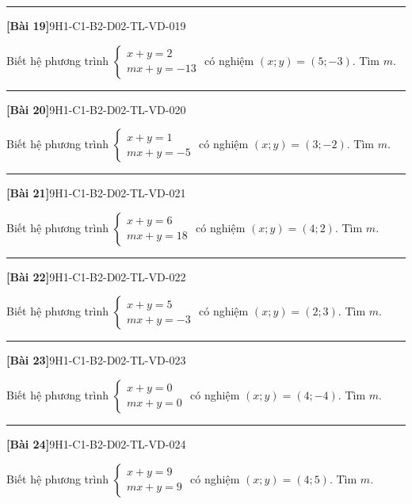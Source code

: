 \documentclass[12pt,a4paper]{article}
\newif\ifloigiai
\newenvironment{cauhoi}[2]{%
  \par\medskip\noindent\rule{\textwidth}{0.4pt}\par\nopagebreak
  \noindent\textbf{[#1]}\hfill{\scriptsize\ttfamily #2}\par\nopagebreak\smallskip}{\par}
\newcommand{\loigiai}[1]{\ifloigiai\par\smallskip\noindent\textit{Lời giải.} #1\par\fi}
\begin{document}
\begin{cauhoi}{Bài 19}{9H1-C1-B2-D02-TL-VD-019}
Biết hệ phương trình $\begin{cases}x+y=2\\ mx+y=-13\end{cases}$ có nghiệm $(x;y)=(5;-3)$. Tìm $m$.
\loigiai{Thay $x=5$, $y=-3$ vào phương trình thứ hai: $5 m-3=-13$ nên $m=\dfrac{-13+3}{5}=-2$.}
\end{cauhoi}
\begin{cauhoi}{Bài 20}{9H1-C1-B2-D02-TL-VD-020}
Biết hệ phương trình $\begin{cases}x+y=1\\ mx+y=-5\end{cases}$ có nghiệm $(x;y)=(3;-2)$. Tìm $m$.
\loigiai{Thay $x=3$, $y=-2$ vào phương trình thứ hai: $3 m-2=-5$ nên $m=\dfrac{-5+2}{3}=-1$.}
\end{cauhoi}
\begin{cauhoi}{Bài 21}{9H1-C1-B2-D02-TL-VD-021}
Biết hệ phương trình $\begin{cases}x+y=6\\ mx+y=18\end{cases}$ có nghiệm $(x;y)=(4;2)$. Tìm $m$.
\loigiai{Thay $x=4$, $y=2$ vào phương trình thứ hai: $4 m+2=18$ nên $m=\dfrac{18-2}{4}=4$.}
\end{cauhoi}
\begin{cauhoi}{Bài 22}{9H1-C1-B2-D02-TL-VD-022}
Biết hệ phương trình $\begin{cases}x+y=5\\ mx+y=-3\end{cases}$ có nghiệm $(x;y)=(2;3)$. Tìm $m$.
\loigiai{Thay $x=2$, $y=3$ vào phương trình thứ hai: $2 m+3=-3$ nên $m=\dfrac{-3-3}{2}=-3$.}
\end{cauhoi}
\begin{cauhoi}{Bài 23}{9H1-C1-B2-D02-TL-VD-023}
Biết hệ phương trình $\begin{cases}x+y=0\\ mx+y=0\end{cases}$ có nghiệm $(x;y)=(4;-4)$. Tìm $m$.
\loigiai{Thay $x=4$, $y=-4$ vào phương trình thứ hai: $4 m-4=0$ nên $m=\dfrac{0+4}{4}=1$.}
\end{cauhoi}
\begin{cauhoi}{Bài 24}{9H1-C1-B2-D02-TL-VD-024}
Biết hệ phương trình $\begin{cases}x+y=9\\ mx+y=9\end{cases}$ có nghiệm $(x;y)=(4;5)$. Tìm $m$.
\loigiai{Thay $x=4$, $y=5$ vào phương trình thứ hai: $4 m+5=9$ nên $m=\dfrac{9-5}{4}=1$.}
\end{cauhoi}
\end{document}
